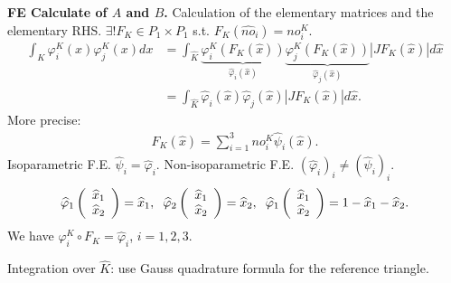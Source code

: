 \documentclass[11pt,a4paper,center,notitlepage]{article}
\numberwithin{equation}{section}
\begin{document}
\noindent
\textbf{FE Calculate of $A$ and $B$.} Calculation of the elementary matrices and the elementary RHS. $\exists !{F_K} \in {P_1} \times {P_1}$ s.t. ${F_K}\left( {{{\widehat {no}}_i}} \right) = no_i^K$.
\begin{align}
\int_K {\varphi _i^K\left( x \right)\varphi _j^K\left( x \right)dx} & = \int_{\widehat K} {\underbrace {\varphi _i^K\left( {{F_K}\left( {\widehat x} \right)} \right)}_{{{\widehat \varphi }_i}\left( {\widehat x} \right)}\underbrace {\varphi _j^K\left( {{F_K}\left( {\widehat x} \right)} \right)}_{{{\widehat \varphi }_j}\left( {\widehat x} \right)}\left| {J{F_K}\left( {\widehat x} \right)} \right|d\widehat x} \\
& = \int_{\widehat K} {{{\widehat \varphi }_i}\left( {\widehat x} \right){{\widehat \varphi }_j}\left( {\widehat x} \right)\left| {J{F_K}\left( {\widehat x} \right)} \right|d\widehat x} .
\end{align}
More precise:
\begin{align}
{F_K}\left( {\widehat x} \right) = \sum\limits_{i = 1}^3 {no_i^K{{\widehat \psi }_i}\left( {\widehat x} \right)} .
\end{align}
Isoparametric F.E. ${\widehat \psi _i} = {\widehat \varphi _i}$. Non-isoparametric F.E. ${\left( {{{\widehat \varphi }_i}} \right)_i} \ne {\left( {{{\widehat \psi }_i}} \right)_i}$.
\begin{align}
{\widehat \varphi _1}\left( {\begin{array}{*{20}{c}}
{{{\widehat x}_1}}\\
{{{\widehat x}_2}}
\end{array}} \right) = {\widehat x_1}, \hspace{2mm} {\widehat \varphi _2}\left( {\begin{array}{*{20}{c}}
{{{\widehat x}_1}}\\
{{{\widehat x}_2}}
\end{array}} \right) = {\widehat x_2},\hspace{2mm} {\widehat \varphi _1}\left( {\begin{array}{*{20}{c}}
{{{\widehat x}_1}}\\
{{{\widehat x}_2}}
\end{array}} \right) = 1 - {\widehat x_1} - {\widehat x_2} .
\end{align}
We have $\varphi _i^K \circ {F_K} = {\widehat \varphi _i}$, $i=1,2,3$. 

Integration over $\widehat{K}$: use Gauss quadrature formula for the reference triangle.
\end{document}
